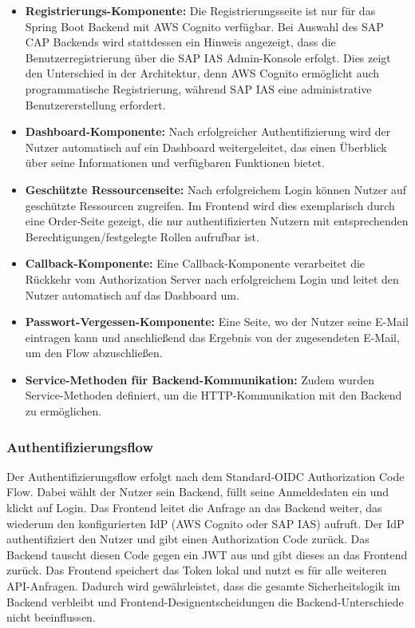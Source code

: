 \begin{itemize}
    \item \textbf{Registrierungs-Komponente:} Die Registrierungsseite ist nur für das Spring Boot Backend mit \ac{AWS} Cognito verfügbar. Bei Auswahl des \ac{SAP CAP} Backends wird stattdessen ein Hinweis angezeigt, dass die Benutzerregistrierung über die \ac{SAP IAS} Admin-Konsole erfolgt. Dies zeigt den Unterschied in der Architektur, denn \ac{AWS} Cognito ermöglicht auch programmatische Registrierung, während \ac{SAP IAS} eine administrative Benutzererstellung erfordert.
    \item \textbf{Dashboard-Komponente:} Nach erfolgreicher Authentifizierung wird der Nutzer automatisch auf ein Dashboard weitergeleitet, das einen Überblick über seine Informationen und verfügbaren Funktionen bietet.
    \item \textbf{Geschützte Ressourcenseite:} Nach erfolgreichem Login können Nutzer auf geschützte Ressourcen zugreifen. Im Frontend wird dies exemplarisch durch eine Order-Seite gezeigt, die nur authentifizierten Nutzern mit entsprechenden Berechtigungen/festgelegte Rollen aufrufbar ist.
    \item \textbf{Callback-Komponente:} Eine Callback-Komponente verarbeitet die Rückkehr vom Authorization Server nach erfolgreichem Login und leitet den Nutzer automatisch auf das Dashboard um.
    \item \textbf{Passwort-Vergessen-Komponente:} Eine Seite, wo der Nutzer seine E-Mail eintragen kann und anschließend das Ergebnis von der zugesendeten E-Mail, um den Flow abzuschließen.
    \item \textbf{Service-Methoden für Backend-Kommunikation:} Zudem wurden Service-Methoden definiert, um die HTTP-Kommunikation mit den Backend zu ermöglichen.
\end{itemize}

\subsubsection{Authentifizierungsflow}

Der Authentifizierungsflow erfolgt nach dem Standard-\ac{OIDC} Authorization Code Flow. Dabei wählt der Nutzer sein Backend, füllt seine Anmeldedaten ein und klickt auf Login. Das Frontend leitet die Anfrage an das Backend weiter, das wiederum den konfigurierten \ac{IdP} (\ac{AWS} Cognito oder \ac{SAP IAS}) aufruft. Der \ac{IdP} authentifiziert den Nutzer und gibt einen Authorization Code zurück. Das Backend tauscht diesen Code gegen ein \ac{JWT} aus und gibt dieses an das Frontend zurück. Das Frontend speichert das Token lokal und nutzt es für alle weiteren API-Anfragen. Dadurch wird gewährleistet, dass die gesamte Sicherheitslogik im Backend verbleibt und Frontend-Designentscheidungen die Backend-Unterschiede nicht beeinflussen.

